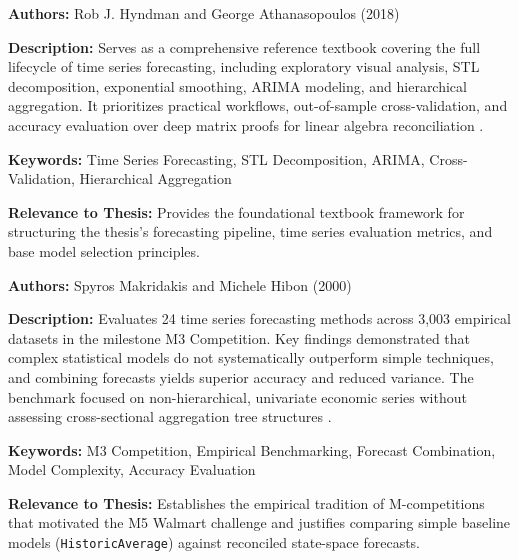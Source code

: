 {

	\textbf{Authors:}
	Rob J. Hyndman and George Athanasopoulos (2018)

	\textbf{Description:}
	Serves as a comprehensive reference textbook covering the full lifecycle of time series forecasting, including exploratory visual analysis, STL decomposition, exponential smoothing, ARIMA modeling, and hierarchical aggregation. It prioritizes practical workflows, out-of-sample cross-validation, and accuracy evaluation over deep matrix proofs for linear algebra reconciliation \autocite{Hyndman:2018}.

	\textbf{Keywords:}
	Time Series Forecasting, STL Decomposition, ARIMA, Cross-Validation, Hierarchical Aggregation

	\textbf{Relevance to Thesis:}
	Provides the foundational textbook framework for structuring the thesis's forecasting pipeline, time series evaluation metrics, and base model selection principles.

}

{

	\textbf{Authors:}
	Spyros Makridakis and Michele Hibon (2000)

	\textbf{Description:}
	Evaluates 24 time series forecasting methods across 3,003 empirical datasets in the milestone M3 Competition. Key findings demonstrated that complex statistical models do not systematically outperform simple techniques, and combining forecasts yields superior accuracy and reduced variance. The benchmark focused on non-hierarchical, univariate economic series without assessing cross-sectional aggregation tree structures \autocite{MakridakisHibon:2000}.

	\textbf{Keywords:}
	M3 Competition, Empirical Benchmarking, Forecast Combination, Model Complexity, Accuracy Evaluation

	\textbf{Relevance to Thesis:}
	Establishes the empirical tradition of M-competitions that motivated the M5 Walmart challenge and justifies comparing simple baseline models (\texttt{HistoricAverage}) against reconciled state-space forecasts.

}

